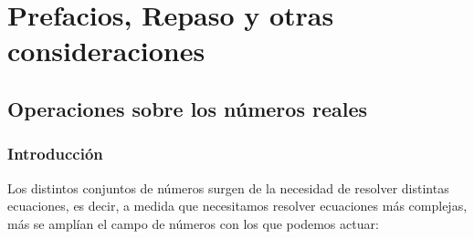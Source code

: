 \part{Prefacios, Repaso y otras consideraciones}



\chapter{Operaciones sobre los números reales}

\minitoc

\newpage
 
\section*{Introducción} 

Los distintos conjuntos de números surgen de la necesidad de resolver distintas ecuaciones, es decir, a medida que necesitamos resolver ecuaciones más complejas, más se amplían el campo de números con los que podemos actuar:
 
